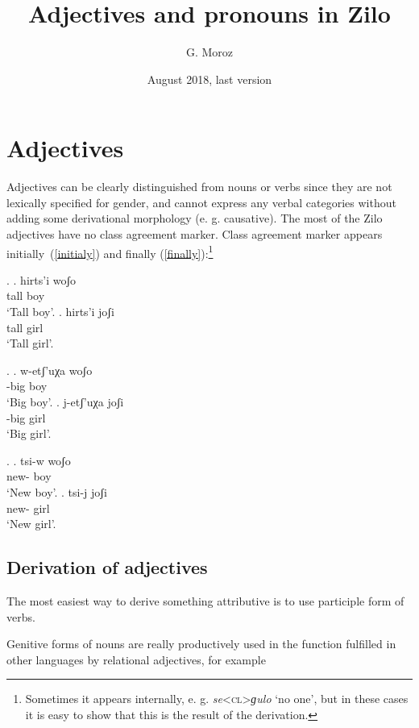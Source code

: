 
\title{\Large Adjectives and pronouns in Zilo}
\author{G. Moroz}
\date{August 2018, last version}
 
\maketitle

\section{Adjectives}
Adjectives can be clearly distinguished from nouns or verbs since they are not lexically specified for gender, and cannot express any verbal categories without adding some derivational morphology (e. g. causative). The most of the Zilo adjectives have no class agreement marker. Class agreement marker appears initially~(\ref{initialy}) and finally (\ref{finally}):\footnote{Sometimes it appears internally, e. g. \textit{se}<\textsc{cl}>\textit{ɡulo} `no one', but in these cases it is easy to show that this is the result of the derivation.}

\ex. 	\ag. hirts'i woʃo\\
				tall boy\\
				\glt `Tall boy'.
		\bg. hirts'i joʃi\\
				tall girl\\
				\glt `Tall girl'.			 

\ex. \label{initialy}	
		\ag. w-etʃ'uχa woʃo\\
				{\M-big} boy\\
				\glt `Big boy'.
		\bg. j-etʃ'uχa joʃi\\
				{\F-big} girl\\
				\glt `Big girl'.

\ex. \label{finally}
		\ag. tsi-w woʃo\\
				{new-\M} boy\\
				\glt `New boy'.
		\bg. tsi-j joʃi\\
				{new-\F} girl\\
				\glt `New girl'.

\subsection{Derivation of adjectives}
The most easiest way to derive something attributive is to use participle form of verbs.

Genitive forms of nouns  are really productively used in the function fulfilled in other languages by relational adjectives, for example 

